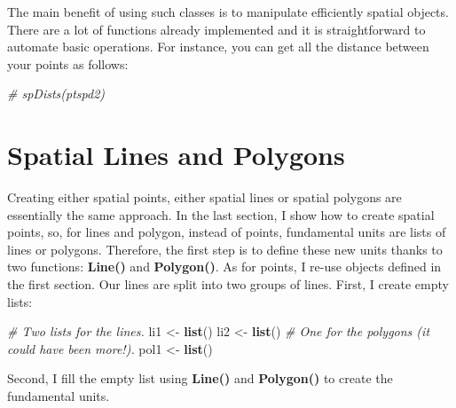 \documentclass[]{report}
\newenvironment{Shaded}{\begin{snugshade}}{\end{snugshade}}
\newcommand{\CommentTok}[1]{\textcolor[rgb]{0.56,0.35,0.01}{\textit{#1}}}
\newcommand{\KeywordTok}[1]{\textcolor[rgb]{0.13,0.29,0.53}{\textbf{#1}}}
\newcommand{\NormalTok}[1]{#1}
\newcommand{\StringTok}[1]{\textcolor[rgb]{0.31,0.60,0.02}{#1}}
\begin{document}
The main benefit of using such classes is to manipulate efficiently
spatial objects. There are a lot of functions already implemented and it
is straightforward to automate basic operations. For instance, you can
get all the distance between your points as follows:

\begin{Shaded}
\begin{Highlighting}[]
\CommentTok{# spDists(ptspd2)}
\end{Highlighting}
\end{Shaded}

\hypertarget{spatial-lines-and-polygons}{%
\section{Spatial Lines and Polygons}\label{spatial-lines-and-polygons}}

Creating either spatial points, either spatial lines or spatial polygons
are essentially the same approach. In the last section, I show how to
create spatial points, so, for lines and polygon, instead of points,
fundamental units are lists of lines or polygons. Therefore, the first
step is to define these new units thanks to two functions:
\textbf{Line()} and \textbf{Polygon()}. As for points, I re-use objects
defined in the first section. Our lines are split into two groups of
lines. First, I create empty lists:

\begin{Shaded}
\begin{Highlighting}[]
\CommentTok{# Two lists for the lines.}
\NormalTok{li1 <-}\StringTok{ }\KeywordTok{list}\NormalTok{()}
\NormalTok{li2 <-}\StringTok{ }\KeywordTok{list}\NormalTok{()}
\CommentTok{# One for the polygons (it could have been more!).}
\NormalTok{pol1 <-}\StringTok{ }\KeywordTok{list}\NormalTok{()}
\end{Highlighting}
\end{Shaded}

Second, I fill the empty list using \textbf{Line()} and
\textbf{Polygon()} to create the fundamental units.
\end{document}
